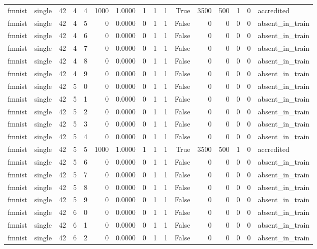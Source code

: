 \begin{tabular}{llrrrrrrrrrrrrrl}
fmnist & single & 42 & 4 & 4 & 1000 & 1.0000 & 1 & 1 & 1 & True & 3500 & 500 & 1 & 0 & accredited \\
fmnist & single & 42 & 4 & 5 & 0 & 0.0000 & 0 & 1 & 1 & False & 0 & 0 & 0 & 0 & absent\_in\_train \\
fmnist & single & 42 & 4 & 6 & 0 & 0.0000 & 0 & 1 & 1 & False & 0 & 0 & 0 & 0 & absent\_in\_train \\
fmnist & single & 42 & 4 & 7 & 0 & 0.0000 & 0 & 1 & 1 & False & 0 & 0 & 0 & 0 & absent\_in\_train \\
fmnist & single & 42 & 4 & 8 & 0 & 0.0000 & 0 & 1 & 1 & False & 0 & 0 & 0 & 0 & absent\_in\_train \\
fmnist & single & 42 & 4 & 9 & 0 & 0.0000 & 0 & 1 & 1 & False & 0 & 0 & 0 & 0 & absent\_in\_train \\
fmnist & single & 42 & 5 & 0 & 0 & 0.0000 & 0 & 1 & 1 & False & 0 & 0 & 0 & 0 & absent\_in\_train \\
fmnist & single & 42 & 5 & 1 & 0 & 0.0000 & 0 & 1 & 1 & False & 0 & 0 & 0 & 0 & absent\_in\_train \\
fmnist & single & 42 & 5 & 2 & 0 & 0.0000 & 0 & 1 & 1 & False & 0 & 0 & 0 & 0 & absent\_in\_train \\
fmnist & single & 42 & 5 & 3 & 0 & 0.0000 & 0 & 1 & 1 & False & 0 & 0 & 0 & 0 & absent\_in\_train \\
fmnist & single & 42 & 5 & 4 & 0 & 0.0000 & 0 & 1 & 1 & False & 0 & 0 & 0 & 0 & absent\_in\_train \\
fmnist & single & 42 & 5 & 5 & 1000 & 1.0000 & 1 & 1 & 1 & True & 3500 & 500 & 1 & 0 & accredited \\
fmnist & single & 42 & 5 & 6 & 0 & 0.0000 & 0 & 1 & 1 & False & 0 & 0 & 0 & 0 & absent\_in\_train \\
fmnist & single & 42 & 5 & 7 & 0 & 0.0000 & 0 & 1 & 1 & False & 0 & 0 & 0 & 0 & absent\_in\_train \\
fmnist & single & 42 & 5 & 8 & 0 & 0.0000 & 0 & 1 & 1 & False & 0 & 0 & 0 & 0 & absent\_in\_train \\
fmnist & single & 42 & 5 & 9 & 0 & 0.0000 & 0 & 1 & 1 & False & 0 & 0 & 0 & 0 & absent\_in\_train \\
fmnist & single & 42 & 6 & 0 & 0 & 0.0000 & 0 & 1 & 1 & False & 0 & 0 & 0 & 0 & absent\_in\_train \\
fmnist & single & 42 & 6 & 1 & 0 & 0.0000 & 0 & 1 & 1 & False & 0 & 0 & 0 & 0 & absent\_in\_train \\
fmnist & single & 42 & 6 & 2 & 0 & 0.0000 & 0 & 1 & 1 & False & 0 & 0 & 0 & 0 & absent\_in\_train \\

\end{tabular}
